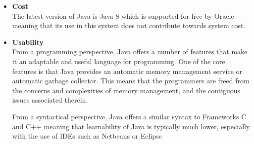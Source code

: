 \documentclass[a4paper,10pt]{article}
\begin{document}
\begin{itemize}
\begin{itemize}
				\item \textbf{Cost}\\
				The latest version of Java is Java 8 which is supported for free by Oracle meaning that its use in this system does not contribute towards system cost.
				
				\item \textbf{Usability}\\
				From a programming perspective, Java offers a number of features that make it an adaptable and useful language for programming. One of the core features is that Java provides an automatic memory management service or automatic garbage collector. This means that the programmers are freed from the concerns and complexities of memory management, and the contiguous issues associated therein.

				From a syntactical perspective, Java offers a similar syntax to 
				Frameworks C and C++ meaning that learnability of Java is typically much lower, especially with the use of IDEs such as Netbeans or Eclipse
			\end{itemize}
\end{itemize}
\end{document}
